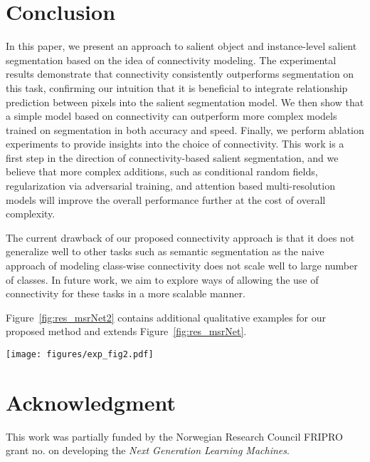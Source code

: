 \documentclass[journal]{IEEEtran}
\begin{document}
\section{Conclusion}
\label{sec:conc}
In this paper, we present an approach to salient object and instance-level salient segmentation based on the idea of connectivity modeling. The experimental results demonstrate that connectivity consistently outperforms segmentation on this task, confirming our intuition that it is beneficial to integrate relationship prediction between pixels into the salient segmentation model. We then show that a simple model based on connectivity can outperform more complex models trained on segmentation in both accuracy and speed. Finally, we perform ablation experiments to provide insights into the choice of connectivity. This work is a first step in the direction of connectivity-based salient segmentation, and we believe that more complex additions, such as conditional random fields, regularization via adversarial training, and attention based multi-resolution models will improve the overall performance further at the cost of overall complexity.

The current drawback of our proposed connectivity approach is that it does not generalize well to other tasks such as semantic segmentation as the naive approach of modeling class-wise connectivity does not scale well to large number of classes. In future work, we aim to explore ways of allowing the use of connectivity for these tasks in a more scalable manner. 

Figure~\ref{fig:res_msrNet2} contains additional qualitative examples for our proposed method and extends Figure~\ref{fig:res_msrNet}.

\begin{figure*}[t]
\centering
\captionsetup[subfigure]{labelformat=empty}
\texttt{[image: figures/exp\_fig2.pdf]}
\caption{Visual comparison of the saliency maps obtained by the proposed method, ConnNet+, and the highest performing methods in Table~\ref{tab:results}. Reported ConnNet+ results are for BlizNet-backbone.}
\label{fig:res_msrNet2}
\end{figure*}

\section*{Acknowledgment}
This work was partially funded by the Norwegian Research Council FRIPRO grant no. on developing the \emph{Next Generation Learning Machines}.
\end{document}
